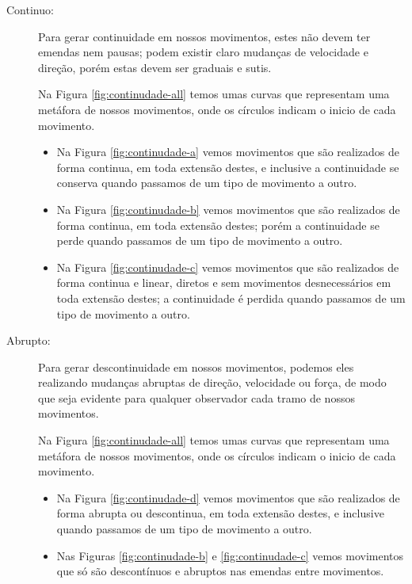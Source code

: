 \begin{description}
\item[Continuo:] Para gerar continuidade em nossos movimentos,
estes não devem ter emendas nem pausas; 
podem existir claro mudanças de velocidade e direção,
porém estas devem ser graduais e sutis.
\begin{example} 
Na Figura \ref{fig:continudade-all} temos umas curvas que representam uma metáfora de nossos movimentos,
onde os círculos indicam o inicio de cada movimento.
\begin{itemize}
\item Na Figura \ref{fig:continudade-a} vemos movimentos que são realizados de forma continua, 
em toda extensão destes, 
e inclusive a continuidade se conserva quando passamos de um tipo de movimento a outro.
\item Na Figura \ref{fig:continudade-b} vemos movimentos que são realizados de forma continua, 
em toda extensão destes;
porém a  continuidade se perde quando passamos de um tipo de movimento a outro.
\item Na Figura \ref{fig:continudade-c} vemos movimentos que são realizados de forma continua e linear,
diretos e sem movimentos desnecessários em toda extensão destes;
a continuidade é perdida quando passamos de um tipo de movimento a outro.
\end{itemize}
\end{example}

\item[Abrupto:] Para gerar descontinuidade em nossos movimentos, 
podemos eles realizando mudanças abruptas de direção, velocidade ou força,
de modo que seja evidente para qualquer observador cada tramo de nossos movimentos.
\begin{example}
Na Figura \ref{fig:continudade-all} temos umas curvas que representam uma metáfora de nossos movimentos,
onde os círculos indicam o inicio de cada movimento.
\begin{itemize}
\item Na Figura \ref{fig:continudade-d} vemos movimentos que são realizados de forma abrupta ou descontinua,
em toda extensão destes, 
e inclusive quando passamos de um tipo de movimento a outro.
\item Nas Figuras \ref{fig:continudade-b} e \ref{fig:continudade-c} 
vemos movimentos que só são descontínuos e abruptos nas emendas entre movimentos. 
\end{itemize}
\end{example}
\end{description}

